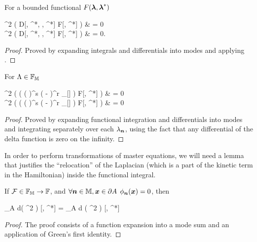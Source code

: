 \begin{lemma}
\label{lmm:func-calculus:zero-integrals}
	For a bounded functional $F(\boldsymbol{\lambda}, \boldsymbol{\lambda}^*)$
	\begin{eqn*}
		\int \delta^2\Lambda
			\frac{\delta}{\delta \Lambda^\prime} \left(
				D[\Lambda, \Lambda^*, \Psi, \Psi^*]
				F[\Lambda, \Lambda^*]
			\right)
		& = 0 \\
		\int \delta^2\Lambda
			\frac{\delta}{\delta \Lambda^{\prime*}}
			\left(
				D[\Lambda, \Lambda^*, \Psi, \Psi^*]
				F[\Lambda, \Lambda^*]
			\right)
		& = 0.
	\end{eqn*}
\end{lemma}
\begin{proof}
Proved by expanding integrals and differentials into modes and applying .
\end{proof}

\begin{lemma}
\label{lmm:func-calculus:zero-delta-integrals}
	For $\Lambda \in \mathbb{F}_{\mathbb{M}}$ \todo{Any limitations on $F$?}
	\begin{eqn*}
		\int \delta^2\Lambda
			\frac{\delta}{\delta \Lambda} \left(
				\left(
					\left( \frac{\delta}{\delta \Lambda} \right)^s
					\left( -\frac{\delta}{\delta \Lambda^*} \right)^r
					\Delta_{\restbasis}[\Lambda]
				\right)
				F[\lambda, \lambda^*]
			\right)
		& = 0 \\
		\int \delta^2\Lambda
			\frac{\delta}{\delta \Lambda^*} \left(
				\left(
					\left( \frac{\delta}{\delta \Lambda} \right)^s
					\left( -\frac{\delta}{\delta \Lambda^*} \right)^r
					\Delta_{\restbasis}[\Lambda]
				\right)
				F[\lambda, \lambda^*]
			\right)
		& = 0 \\
	\end{eqn*}
\end{lemma}
\begin{proof}
Proved by expanding functional integration and differentials into modes and integrating separately over each $\lambda_{\boldsymbol{n}}$, using the fact that any differential of the delta function is zero on the infinity.
\end{proof}

In order to perform transformations of master equations, we will need a lemma that justifies the ``relocation'' of the Laplacian (which is a part of the kinetic term in the Hamiltonian) inside the functional integral.

\begin{lemma}
\label{lmm:func-calculus:move-laplacian}
	If $\mathcal{F} \in \mathbb{F}_{\mathbb{M}} \rightarrow \mathbb{F}$, and $\forall \boldsymbol{n} \in \mathbb{M}, \boldsymbol{x} \in \partial A$ $\phi_{\boldsymbol{n}}(\boldsymbol{x}) = 0$, then
	\begin{eqn*}
		\int\limits_A d\xvec \left(
			\nabla^2 \frac{\delta}{\delta \Psi}
		\right) \Psi {}[\Psi, \Psi^*]
		= \int\limits_A d\xvec \frac{\delta}{\delta \Psi}
		( \nabla^2 \Psi ) [\Psi, \Psi^*]
	\end{eqn*}
\end{lemma}
\begin{proof}
The proof consists of a function expansion into a mode sum and an application of Green's first identity.
\end{proof}

